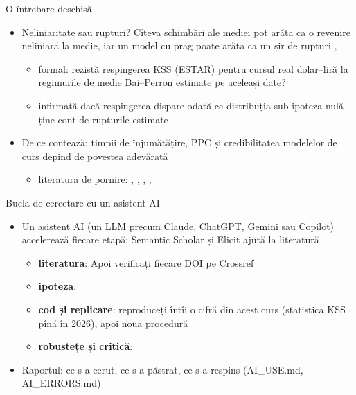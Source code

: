\begin{frame}{O întrebare deschisă}
\itemsize{\small}
\begin{itemize}
    \item Neliniaritate sau rupturi? Cîteva schimbări ale mediei pot arăta ca o revenire neliniară la medie, iar un model cu prag poate arăta ca un șir de rupturi , 
    \begin{itemize}
        \item formal: rezistă respingerea KSS (ESTAR) pentru cursul real dolar--liră la regimurile de medie Bai--Perron estimate pe aceleași date?
        \item infirmată dacă respingerea dispare odată ce distribuția sub ipoteza nulă ține cont de rupturile estimate
    \end{itemize}
    \item De ce contează: timpii de înjumătățire, PPC și credibilitatea modelelor de curs depind de povestea adevărată
    \begin{itemize}
        \item literatura de pornire: , , , , 
    \end{itemize}
\end{itemize}
\end{frame}

\begin{frame}{Bucla de cercetare cu un asistent AI}
\itemsize{\footnotesize}
\begin{itemize}
    \item Un asistent AI (un LLM precum Claude, ChatGPT, Gemini sau Copilot) accelerează fiecare etapă; Semantic Scholar și Elicit ajută la literatură
    \begin{itemize}
        \item \textbf{literatura}:  Apoi verificați fiecare DOI pe Crossref
        \item \textbf{ipoteza}: 
        \item \textbf{cod și replicare}: reproduceți întîi o cifră din acest curs (statistica KSS pînă în 2026), apoi noua procedură
        \item \textbf{robustețe și critică}: 
    \end{itemize}
    \item Raportul: ce s-a cerut, ce s-a păstrat, ce s-a respins (AI\_USE.md, AI\_ERRORS.md)
\end{itemize}
\end{frame}

